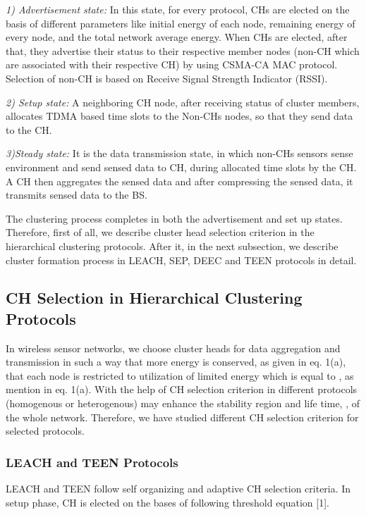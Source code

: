 \documentclass[journal]{IEEEtran}
\begin{document}
{\textit{1) Advertisement state:} In this state, for every protocol, CHs are elected on the basis of different parameters like initial energy of each node, remaining energy of every node, and the total network average energy. When CHs are elected, after that, they advertise their status to their respective member nodes (non-CH which are associated with their respective CH) by using CSMA-CA MAC protocol. Selection of non-CH is based on Receive Signal Strength Indicator (RSSI).

\textit{2) Setup state:} A neighboring CH node, after receiving status of cluster members, allocates TDMA based time slots to the Non-CHs nodes, so that they send data to the CH.

\textit{3)Steady state:} It is the data transmission state, in which non-CHs sensors sense environment and send sensed data to CH, during allocated time slots by the CH. A CH then aggregates the sensed data and after compressing the sensed data, it transmits sensed data to the BS.

The clustering process completes in both the advertisement and set up states. Therefore, first of all, we describe cluster head selection criterion in the hierarchical clustering protocols. After it, in the next subsection, we describe cluster formation process in LEACH, SEP, DEEC and TEEN protocols in detail.

\subsection{CH Selection in Hierarchical Clustering Protocols}
In wireless sensor networks, we choose cluster heads for data aggregation and transmission in such a way that more energy is conserved, as given in eq. 1(a), that each node is restricted to utilization of limited energy which is equal to , as mention in eq. 1(a). With the help of CH selection criterion in different protocols (homogenous or heterogenous) may enhance the stability region and life time, , of the whole network. Therefore, we have studied different CH selection criterion for selected protocols.

\subsubsection{LEACH and TEEN Protocols}
 LEACH and TEEN follow self organizing and adaptive CH selection criteria. In setup phase, CH is elected on the bases of following threshold equation [1].

}
\end{document}

